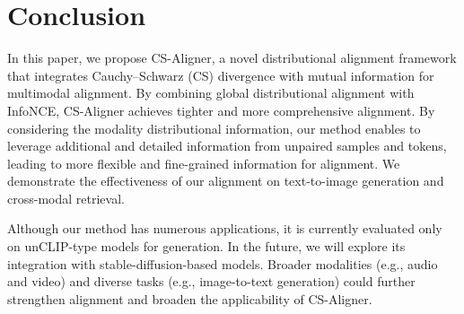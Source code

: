 \section{Conclusion}
\label{sec:con}

In this paper, we propose CS-Aligner, a novel distributional alignment framework that integrates Cauchy–Schwarz (CS) divergence with mutual information for multimodal alignment. By combining global distributional alignment with InfoNCE, CS-Aligner achieves tighter and more comprehensive alignment. 
By considering the modality distributional information, our method enables to leverage additional and detailed information from unpaired samples and tokens, leading to more flexible and fine-grained information for alignment. 
We demonstrate the effectiveness of our alignment on text-to-image generation and cross-modal retrieval. 


 Although our method has numerous applications, it is currently evaluated only on unCLIP-type models for generation. In the future, we will explore its integration with stable-diffusion-based models. 
Broader modalities (e.g., audio and video) and diverse tasks (e.g., image-to-text generation) could further strengthen alignment and broaden the applicability of CS-Aligner.

